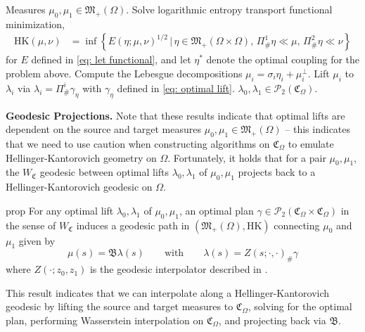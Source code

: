 \documentclass[11pt]{article}
\begin{document}
\begin{algorithm}[H]
    \begin{algorithmic}[1] \label{alg: lift measures to cone}
        \caption{Lift measures from  $(\mathfrak{M}_+(\Omega), \text{HK})$ to $(\mathcal{P}_{2}(\mathfrak{C}_\Omega), W_2)$}
        \label{alg: let lift}
        \Require Measures $\mu_0, \mu_1 \in \mathfrak{M}_+(\Omega)$.  
        \State Solve logarithmic entropy transport functional minimization,
        \begin{align*} 
            \text{HK}(\mu, \nu) &= \inf\left\{E(\eta;\mu, \nu)^{1/2} \, |\, \eta  \in \mathfrak{M}_+(\Omega \times \Omega), \,\Pi^1_{\#}\eta  \ll \mu, \, \Pi^2_{\#}\eta \ll \nu\right\}
        \end{align*}
        for $E$ defined in \cref{eq: let functional}, and let $\eta^*$ denote the optimal coupling for the problem above. 
        \State Compute the Lebesgue decompositions $\mu_i = \sigma_i\eta_i + \mu_i^\perp$.
        \State Lift $\mu_i$ to $\lambda_i$ via $\lambda_i = \Pi^i_{\#}\gamma_{\eta}$ with $\gamma_{\eta}$ defined in \cref{eq: optimal lift}.
        \State \Return $\lambda_0, \lambda_1  \in \mathcal{P}_{2}(\mathfrak{C}_{\Omega})$. 
    \end{algorithmic}
\end{algorithm}

\noindent \textbf{Geodesic Projections.} Note that these results indicate that optimal lifts are dependent on the source and target measures $\mu_0, \mu_1 \in \mathfrak{M}_+(\Omega)$ -- this indicates that we need to use caution when constructing algorithms on $\mathfrak{C}_\Omega$ to emulate Hellinger-Kantorovich geometry on $\Omega$. Fortunately, it holds that for a pair $\mu_0, \mu_1$, the $W_\mathfrak{C}$ geodesic between optimal lifts $\lambda_0, \lambda_1$ of $\mu_0, \mu_1$ projects back to a Hellinger-Kantorovich geodesic on $\Omega$. 

\begin{restatable}{prop}{} \label{cone geodesics project to hk geodesics}
    For any optimal lift $\lambda_0, \lambda_1$ of $\mu_0, \mu_1$, an optimal plan $\gamma \in \mathcal{P}_2(\mathfrak{C}_\Omega \times \mathfrak{C}_\Omega)$ in the sense of $W_\mathfrak{C}$ induces a geodesic path in $(\mathfrak{M}_+(\Omega), \text{HK})$ connecting $\mu_0$ and $\mu_1$ given by
    \[\mu(s) = \mathfrak{B}\lambda(s) \qquad \text{with} \qquad \lambda(s) = Z(s; \cdot, \cdot)_\#\gamma\]
    where $Z(\cdot; z_0, z_1)$ is the geodesic interpolator described in .
\end{restatable}
This result indicates that we can interpolate along a Hellinger-Kantorovich geodesic by lifting the source and target measures to $\mathfrak{C}_\Omega$, solving for the optimal plan, performing Wasserstein interpolation on $\mathfrak{C}_\Omega$, and projecting back via $\mathfrak{B}$.
\\
\end{document}
